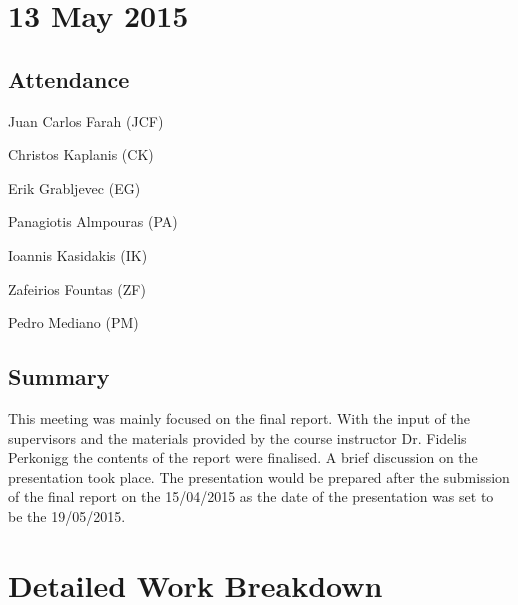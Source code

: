 \documentclass[a4paper,11pt]{article}
\begin{document}
\begin{appendices}
\maketitle
\section*{13 May 2015}
\subsection*{Attendance}
\begin{compactenum}
\item Juan Carlos Farah (JCF)
\item Christos Kaplanis (CK)
\item Erik Grabljevec (EG)
\item Panagiotis Almpouras (PA)
\item Ioannis Kasidakis (IK)
\item Zafeirios Fountas (ZF)
\item Pedro Mediano (PM)
\end{compactenum}

\subsection*{Summary}
This meeting was mainly focused on the final report. With the input of the supervisors and the materials provided by the course instructor Dr. Fidelis Perkonigg the contents of the report were finalised. A brief discussion on the presentation took place. The presentation would be prepared after the submission of the final report on the 15/04/2015 as the date of the presentation was set to be the 19/05/2015.



\clearpage
\section{Detailed Work Breakdown}


\end{appendices}
\end{document}
